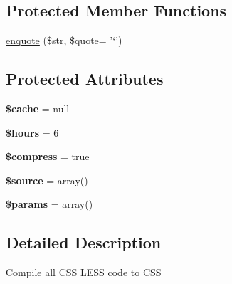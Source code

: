 \subsection*{Protected Member Functions}
\begin{DoxyCompactItemize}
\item 
\hyperlink{classTk_1_1Dom_1_1Modifier_1_1Filter_1_1Less_ac1a25e2d58d9e8fb8617fad5a7008cff}{enquote} (\$str, \$quote= '\char`\"{}') 
\end{DoxyCompactItemize}
\subsection*{Protected Attributes}
\begin{DoxyCompactItemize}
\item 
\hypertarget{classTk_1_1Dom_1_1Modifier_1_1Filter_1_1Less_af76e7354348cc308be8e0f801108bff8}{{\bfseries \$cache} = null}\label{classTk_1_1Dom_1_1Modifier_1_1Filter_1_1Less_af76e7354348cc308be8e0f801108bff8}

\item 
\hypertarget{classTk_1_1Dom_1_1Modifier_1_1Filter_1_1Less_a44764cd4e41538a823f13ef51a1a0b3f}{{\bfseries \$hours} = 6}\label{classTk_1_1Dom_1_1Modifier_1_1Filter_1_1Less_a44764cd4e41538a823f13ef51a1a0b3f}

\item 
\hypertarget{classTk_1_1Dom_1_1Modifier_1_1Filter_1_1Less_a7827b46e37535209bb1129f2c06db490}{{\bfseries \$compress} = true}\label{classTk_1_1Dom_1_1Modifier_1_1Filter_1_1Less_a7827b46e37535209bb1129f2c06db490}

\item 
\hypertarget{classTk_1_1Dom_1_1Modifier_1_1Filter_1_1Less_a5ead1be1089e6e275ce8a3e861746584}{{\bfseries \$source} = array()}\label{classTk_1_1Dom_1_1Modifier_1_1Filter_1_1Less_a5ead1be1089e6e275ce8a3e861746584}

\item 
\hypertarget{classTk_1_1Dom_1_1Modifier_1_1Filter_1_1Less_ab64134440fa3b9cc94bd12988a6b281c}{{\bfseries \$params} = array()}\label{classTk_1_1Dom_1_1Modifier_1_1Filter_1_1Less_ab64134440fa3b9cc94bd12988a6b281c}

\end{DoxyCompactItemize}


\subsection{Detailed Description}
Compile all C\+S\+S L\+E\+S\+S code to C\+S\+S

